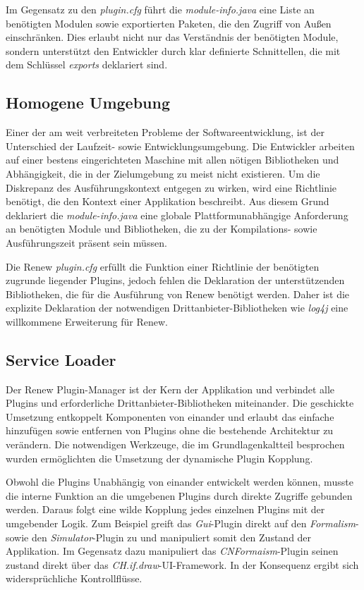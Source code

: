 Im Gegensatz zu den \textit{plugin.cfg} führt die \textit{module-info.java} eine Liste an benötigten Modulen sowie exportierten Paketen, die den Zugriff von Außen einschränken. Dies erlaubt nicht nur das Verständnis der benötigten Module, sondern unterstützt den Entwickler durch klar definierte Schnittellen, die mit dem Schlüssel \textit{exports} deklariert sind.

\subsection{Homogene Umgebung}
Einer der am weit verbreiteten Probleme der Softwareentwicklung, ist der Unterschied der Laufzeit- sowie Entwicklungsumgebung. Die Entwickler arbeiten auf einer bestens eingerichteten Maschine mit allen nötigen Bibliotheken und Abhängigkeit, die in der Zielumgebung zu meist nicht existieren. Um die Diskrepanz des Ausführungskontext entgegen zu wirken, wird eine Richtlinie benötigt, die den Kontext einer Applikation beschreibt. Aus diesem Grund deklariert die \textit{module-info.java} eine globale Plattformunabhängige Anforderung an benötigten Module und Bibliotheken, die zu der Kompilations- sowie Ausführungszeit präsent sein müssen.
\bigbreak

Die Renew \textit{plugin.cfg} erfüllt die Funktion einer Richtlinie der benötigten zugrunde liegender Plugins, jedoch fehlen die Deklaration der unterstützenden Bibliotheken, die für die Ausführung von Renew benötigt werden. Daher ist die explizite Deklaration der notwendigen Drittanbieter-Bibliotheken wie \textit{log4j} eine willkommene Erweiterung für Renew. 

\subsection{Service Loader} 
Der Renew Plugin-Manager ist der Kern der Applikation und verbindet alle Plugins und erforderliche Drittanbieter-Bibliotheken miteinander. Die geschickte Umsetzung entkoppelt Komponenten von einander und erlaubt das einfache hinzufügen sowie entfernen von Plugins ohne die bestehende Architektur zu verändern. Die notwendigen Werkzeuge, die im Grundlagenkaltteil besprochen wurden ermöglichten die Umsetzung der dynamische Plugin Kopplung. 
\bigbreak

Obwohl die Plugins Unabhängig von einander entwickelt werden können, musste die interne Funktion an die umgebenen Plugins durch direkte Zugriffe gebunden werden. Daraus folgt eine wilde Kopplung jedes einzelnen Plugins mit der umgebender Logik. Zum Beispiel greift das \textit{Gui}-Plugin direkt auf den \textit{Formalism}- sowie den \textit{Simulator}-Plugin zu und manipuliert somit den Zustand der Applikation. Im Gegensatz dazu manipuliert das \textit{CNFormaism}-Plugin seinen zustand direkt über das \textit{CH.if.draw}-UI-Framework. In der Konsequenz ergibt sich widersprüchliche Kontrollflüsse.  


